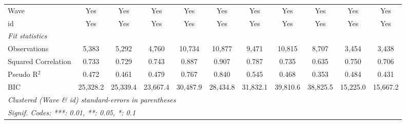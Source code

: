 \begin{table}[htbp]
\begin{tabular}{lcccccccccc}
      Wave                             & Yes            & Yes              & Yes         & Yes          & Yes           & Yes           & Yes          & Yes           & Yes         & Yes\\  
      id                               & Yes            & Yes              & Yes         & Yes          & Yes           & Yes           & Yes          & Yes           & Yes         & Yes\\  
      \midrule
      \emph{Fit statistics}\\
      Observations                     & 5,383          & 5,292            & 4,760       & 10,734       & 10,877        & 9,471         & 10,815       & 8,707         & 3,454       & 3,438\\  
      Squared Correlation              & 0.733          & 0.729            & 0.743       & 0.887        & 0.907         & 0.787         & 0.735        & 0.635         & 0.750       & 0.706\\  
      Pseudo R$^2$                     & 0.472          & 0.461            & 0.479       & 0.767        & 0.840         & 0.545         & 0.468        & 0.353         & 0.484       & 0.431\\  
      BIC                              & 25,328.2       & 25,339.4         & 23,667.4    & 30,487.9     & 28,434.8      & 31,832.1      & 39,810.6     & 38,825.5      & 15,225.0    & 15,667.2\\  
      \midrule \midrule
      \multicolumn{11}{l}{\emph{Clustered (Wave \& id) standard-errors in parentheses}}\\
      \multicolumn{11}{l}{\emph{Signif. Codes: ***: 0.01, **: 0.05, *: 0.1}}\\
   \end{tabular}
\end{table}


